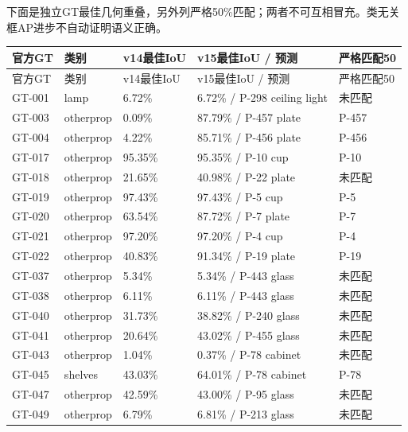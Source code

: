 \documentclass[UTF8,fontset=fandol]{ctexart}
\begin{document}
下面是独立GT最佳几何重叠，另外列严格50\%匹配；两者不可互相冒充。类无关框AP进步不自动证明语义正确。



{\small
\begin{longtable}{|p{}|p{}|p{}|p{}|p{}|}
\hline
官方GT & 类别 & v14最佳IoU & v15最佳IoU / 预测 & 严格匹配50 \\ \hline
\endfirsthead
\hline
官方GT & 类别 & v14最佳IoU & v15最佳IoU / 预测 & 严格匹配50 \\ \hline
\endhead
GT-001 & lamp & 6.72\% & 6.72\% / P-298 ceiling light & 未匹配 \\ \hline
GT-003 & otherprop & 0.09\% & 87.79\% / P-457 plate & P-457 \\ \hline
GT-004 & otherprop & 4.22\% & 85.71\% / P-456 plate & P-456 \\ \hline
GT-017 & otherprop & 95.35\% & 95.35\% / P-10 cup & P-10 \\ \hline
GT-018 & otherprop & 21.65\% & 40.98\% / P-22 plate & 未匹配 \\ \hline
GT-019 & otherprop & 97.43\% & 97.43\% / P-5 cup & P-5 \\ \hline
GT-020 & otherprop & 63.54\% & 87.72\% / P-7 plate & P-7 \\ \hline
GT-021 & otherprop & 97.20\% & 97.20\% / P-4 cup & P-4 \\ \hline
GT-022 & otherprop & 40.83\% & 91.34\% / P-19 plate & P-19 \\ \hline
GT-037 & otherprop & 5.34\% & 5.34\% / P-443 glass & 未匹配 \\ \hline
GT-038 & otherprop & 6.11\% & 6.11\% / P-443 glass & 未匹配 \\ \hline
GT-040 & otherprop & 31.73\% & 38.82\% / P-240 glass & 未匹配 \\ \hline
GT-041 & otherprop & 20.64\% & 43.02\% / P-455 glass & 未匹配 \\ \hline
GT-043 & otherprop & 1.04\% & 0.37\% / P-78 cabinet & 未匹配 \\ \hline
GT-045 & shelves & 43.03\% & 64.01\% / P-78 cabinet & P-78 \\ \hline
GT-047 & otherprop & 42.59\% & 43.00\% / P-95 glass & 未匹配 \\ \hline
GT-049 & otherprop & 6.79\% & 6.81\% / P-213 glass & 未匹配 \\ \hline

\end{longtable}}
\end{document}
